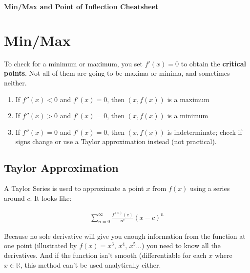 \documentclass{article}
\begin{document}
\fontsize{14}{16}\selectfont

\begin{center}
    \textbf{\underline{Min/Max and Point of Inflection Cheatsheet}}
\end{center}

\tableofcontents
\pagebreak


\section{Min/Max}

To check for a minimum or maximum, you set $f'(x)=0$ to obtain the \textbf{critical points}. Not all of them are going to be maxima or minima, and sometimes neither. 


\begin{enumerate}
    \item If $f''(x)<0$ and $f'(x)=0$, then $(x,f(x))$ is a maximum 
    \item If $f''(x)>0$ and $f'(x)=0$, then $(x,f(x))$ is a minimum
    \item If $f''(x)=0$ and $f'(x)=0$, then $(x,f(x))$ is indeterminate; check if signs change or use a Taylor approximation instead (not practical). 
\end{enumerate}

\subsection{Taylor Approximation}

A Taylor Series is used to approximate a point $x$ from $f(x)$ using a series around $c$. It looks like:

\begin{align}
    \sum_{n=0}^{\infty}{\frac{f^{(n)}(c)}{n!}(x-c)^n}
\end{align}

Because no sole derivative will give you enough information from the function at one point (illustrated by $f(x)=x^3$, $x^4$, $x^5$...) you need to know all the derivatives. And if the function isn't smooth (differentiable for each $x$ where $x \in \mathbb{R}$, this method can't be used analytically either.
\end{document}
